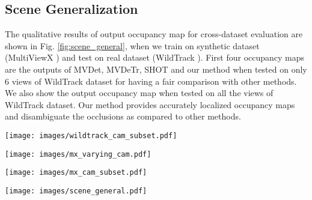 \documentclass[letterpaper, 10 pt, conference]{ieeeconf}  \usepackage{times}
\newcommand{\wildtrack}{WildTrack }
\newcommand{\multiviewx}{MultiViewX }
\begin{document}
\subsection{Scene Generalization}
The qualitative results of output occupancy map for cross-dataset evaluation are shown in Fig. \ref{fig:scene_general}, when we train on synthetic dataset (\multiviewx) and test on real dataset (\wildtrack).
First four occupancy maps are the outputs of MVDet, MVDeTr, SHOT and our method when tested on only 6 views of \wildtrack dataset for having a fair comparison with other methods. We also show the output occupancy map when tested on all the views of \wildtrack dataset. Our method provides accurately localized occupancy maps and disambiguate the occlusions as compared to other methods.


\begin{figure*}[t]
    \centering
    \texttt{[image: images/wildtrack\_cam\_subset.pdf]}
    \caption{Result occupancy maps for cross subset evaluation from \wildtrack dataset.}
    \label{fig:wildtrack_cam_subset}
\end{figure*}

\begin{figure*}[t]
    \centering
    \texttt{[image: images/mx\_varying\_cam.pdf]}
    \caption{Occupancy maps for varying number of cameras on \multiviewx dataset when trained on seven cameras and tested on varying subsets of the cameras.}
    \label{fig:mx_varying_cam}
\end{figure*}


\begin{figure*}[t!]
    \centering
    \texttt{[image: images/mx\_cam\_subset.pdf]}
    \caption{Result occupancy maps for cross subset evaluation from \wildtrack dataset.}
    \label{fig:mx_cam_subset}
\end{figure*}

\begin{figure*}[t!]
    \centering
    \texttt{[image: images/scene\_general.pdf]}
    \caption{Occupancy maps obtained on inference from \wildtrack dataset where the models where trained on the synthetic dataset (\multiviewx).}
    \label{fig:scene_general}
\end{figure*}
\end{document}
